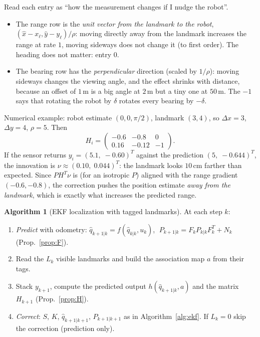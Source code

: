\documentclass[11pt,a4paper]{article}
\def\bm#1{#1}%
\def\boldsymbol#1{#1}%
\newcommand{\hq}{\hat{\boldsymbol{q}}}
\theoremstyle{definition}
\newtheorem{algorithm}[definition]{Algorithm}
\theoremstyle{plain}
\theoremstyle{remark}
\begin{document}
\begin{intuition}
Read each entry as ``how the measurement changes if I nudge the robot''.
\begin{itemize}
  \item The range row is the \emph{unit vector from the landmark to the robot}, $(\hat x-x_\ell,\hat y-y_\ell)/\rho$: moving directly away from the landmark increases the range at rate $1$, moving sideways does not change it (to first order). The heading does not matter: entry $0$.
  \item The bearing row has the \emph{perpendicular} direction (scaled by $1/\rho$): moving sideways changes the viewing angle, and the effect shrinks with distance, because an offset of $1$\,m is a big angle at $2$\,m but a tiny one at $50$\,m. The $-1$ says that rotating the robot by $\delta$ rotates every bearing by $-\delta$.
\end{itemize}
Numerical example: robot estimate $(0,0,\pi/2)$, landmark $(3,4)$, so $\Delta x=3$, $\Delta y=4$, $\rho=5$. Then
\[
\bm H_i=\begin{pmatrix}-0.6&-0.8&0\\ 0.16&-0.12&-1\end{pmatrix}.
\]
If the sensor returns $\bm y_i=(5.1,\;-0.60)^T$ against the prediction $(5,\;-0.644)^T$, the innovation is $\bm\nu\approx(0.10,\;0.044)^T$: the landmark looks $10$\,cm farther than expected. Since $P\bm H^T\bm\nu$ is (for an isotropic $\bm P$) aligned with the range gradient $(-0.6,-0.8)$, the correction pushes the position estimate \emph{away from the landmark}, which is exactly what increases the predicted range.
\end{intuition}

\begin{algorithm}[EKF localization with tagged landmarks]
\label{alg:ekfloc}
At each step $k$:
\begin{enumerate}[label=\textbf{\arabic*.},leftmargin=1.6em]
  \item \emph{Predict} with odometry: $\hq_{k+1|k}=\bm f(\hq_{k|k},\bm u_k)$, $\;\bm P_{k+1|k}=\bm F_k\bm P_{k|k}\bm F_k^T+\bm N_k$ (Prop.~\ref{prop:F}).
  \item Read the $L_k$ visible landmarks and build the association map $a$ from their tags.
  \item Stack $\bm y_{k+1}$, compute the predicted output $\bm h(\hq_{k+1|k},a)$ and the matrix $\bm H_{k+1}$ (Prop.~\ref{prop:H}).
  \item \emph{Correct}: $\bm S$, $\bm K$, $\hq_{k+1|k+1}$, $\bm P_{k+1|k+1}$ as in Algorithm~\ref{alg:ekf}. If $L_k=0$ skip the correction (prediction only).
\end{enumerate}
\end{algorithm}
\end{document}
